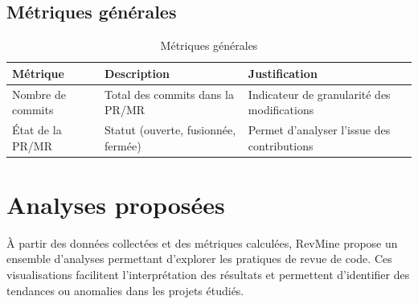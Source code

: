 \subsection{Métriques générales}

\begin{table}[H]
\centering
\begin{tabular}{|l|p{5cm}|p{6cm}|}
\hline
\textbf{Métrique} & \textbf{Description} & \textbf{Justification} \\
\hline
Nombre de commits & Total des commits dans la PR/MR & Indicateur de granularité des modifications \\
\hline
État de la PR/MR & Statut (ouverte, fusionnée, fermée) & Permet d’analyser l’issue des contributions \\
\hline
\end{tabular}
\caption{Métriques générales}
\end{table}

\section{Analyses proposées}

À partir des données collectées et des métriques calculées, RevMine propose un ensemble d’analyses permettant d’explorer les pratiques de revue de code. Ces visualisations facilitent l’interprétation des résultats et permettent d’identifier des tendances ou anomalies dans les projets étudiés.

